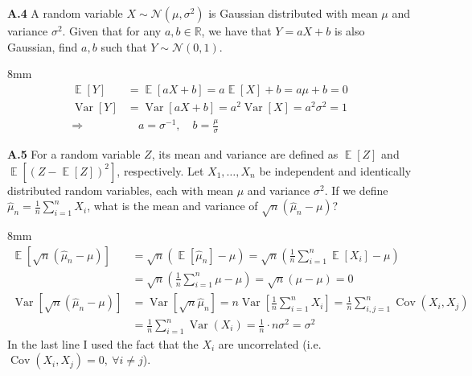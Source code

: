 \documentclass{article}
\DeclareMathOperator{\E}{\mathbb{E}}
\DeclareMathOperator{\cov}{Cov}
\DeclareMathOperator{\var}{Var}
\newenvironment{solution}{\begin{adjustwidth}{8mm}{}}{\end{adjustwidth}}
\begin{document}
\textbf{A.4}
A random variable $X \sim \mathcal{N}(\mu,\sigma^2)$ is Gaussian distributed with mean $\mu$ and variance $\sigma^2$.
Given that for any $a,b \in \mathbb{R}$, we have that $Y = aX + b$ is also Gaussian, find $a,b$ such that $Y \sim \mathcal{N}(0,1)$.

\begin{solution}
        \vspace{-5mm}
        \begin{align*}
                \E[Y] &= \E[aX + b] = a\E[X] + b = a\mu + b = 0 \\
                \var[Y] &= \var[aX+b] = a^2 \var[X] = a^2 \sigma^2 = 1 \\
                \Rightarrow& \quad a = \sigma^{-1}, \quad b = \frac{\mu}{\sigma}
        \end{align*}
\end{solution}


\textbf{A.5}
For a random variable $Z$, its mean and variance are defined as $\E[Z]$ and $\E[(Z-\E[Z])^2]$, respectively.
Let $X_1, \dots, X_n$ be independent and identically distributed random variables, each with mean $\mu$ and variance $\sigma^2$.
If we define $\hat{\mu}_n = \frac{1}{n} \sum_{i=1}^n X_i$, what is the mean and variance of $\sqrt{n}(\hat{\mu}_n - \mu)$? \newline

\begin{solution}
        \vspace{-5mm}
        \begin{align*}
                \E \left[ \sqrt{n}(\hat{\mu}_n - \mu) \right] 
                &= \sqrt{n} \left( \E[\hat{\mu}_n] - \mu \right) 
                 = \sqrt{n} \left( \frac{1}{n} \sum_{i=1}^n \E[X_i] - \mu \right) \\
                &= \sqrt{n} \left( \frac{1}{n} \sum_{i=1}^n \mu - \mu \right) 
                 = \sqrt{n} (\mu - \mu) = 0 \\
                \var \left[ \sqrt{n}(\hat{\mu}_n - \mu) \right]
                &= \var \left[ \sqrt{n} \hat{\mu}_n \right] = n \var \left[ \frac{1}{n} \sum_{i=1}^n X_i \right] = \frac{1}{n} \sum_{i,j = 1}^n \cov(X_i,X_j) \\
                &= \frac{1}{n} \sum_{i = 1}^n \var(X_i) = \frac{1}{n} \cdot n \sigma^2 = \sigma^2
        \end{align*}
        In the last line I used the fact that the $X_i$ are uncorrelated (i.e. $\cov(X_i,X_j) = 0, ~ \forall i \neq j$).
\end{solution}
\end{document}
